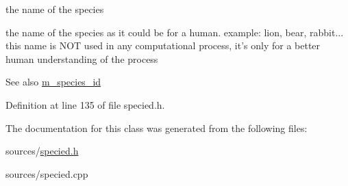the name of the species 

the name of the species as it could be for a human. example: lion, bear, rabbit... this name is NOT used in any computational process, it's only for a better human understanding of the process

\begin{DoxySeeAlso}{See also}
\hyperlink{classSpecied_a7ddb2bbcdf287f07894da310b0a37dd0}{m\_\-species\_\-id} 
\end{DoxySeeAlso}


Definition at line 135 of file specied.h.



The documentation for this class was generated from the following files:\begin{DoxyCompactItemize}
\item 
sources/\hyperlink{specied_8h}{specied.h}\item 
sources/specied.cpp\end{DoxyCompactItemize}
